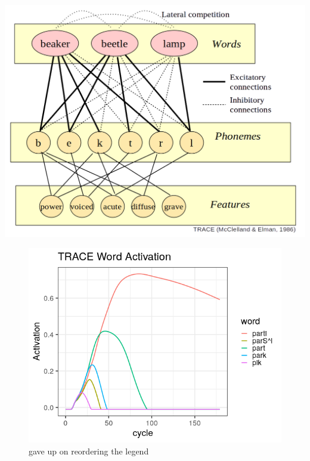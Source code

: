\documentclass{beamer}
\begin{document}
\begin{frame}
\begin{center}
\includegraphics[scale=0.4]{img/trace_competition.png}
\end{center}
\end{frame}

\begin{frame}
\begin{figure}
\centering
\includegraphics[scale=0.5]{img/trace_plot.png}
\caption{gave up on reordering the legend}
\end{figure}
\end{frame}
\end{document}
